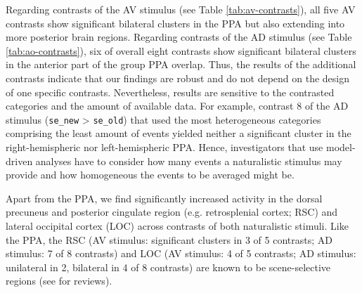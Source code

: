 \documentclass[english]{article}
\begin{document}

Regarding contrasts of the AV stimulus (see Table \ref{tab:av-contrasts}), all
five AV contrasts show significant bilateral clusters in the PPA but also
extending into more posterior brain regions.
Regarding contrasts of the AD stimulus (see Table \ref{tab:ao-contrasts}), six
of overall eight contrasts show significant bilateral clusters in the anterior
part of the group PPA overlap.
Thus, the results of the additional contrasts indicate that our findings are
robust and do not depend on the design of one specific contrasts.
Nevertheless, results are sensitive to the contrasted categories and the amount
of available data.
For example, contrast 8 of the AD stimulus (\texttt{se\_new} > \texttt{se\_old})
that used the most heterogeneous categories comprising the least amount of
events yielded neither a significant cluster in the right-hemispheric nor
left-hemispheric PPA.
Hence, investigators that use model-driven analyses have to consider how many
events a naturalistic stimulus may provide and how homogeneous the events to be
averaged might be.



Apart from the PPA, we find significantly increased activity in the dorsal
precuneus and posterior cingulate region (e.g. retrosplenial cortex; RSC) and
lateral occipital cortex (LOC) across contrasts of both naturalistic stimuli.
Like the PPA, the RSC (AV stimulus: significant clusters in 3 of 5 contrasts; AD
stimulus: 7 of 8 contrasts) and LOC (AV stimulus: 4 of 5 contrasts; AD stimulus:
unilateral in 2, bilateral in 4 of 8 contrasts) are known to be scene-selective
regions (see \citep{chrastil2018heterogeneity, bettencourt2013role} for
reviews).
\end{document}
